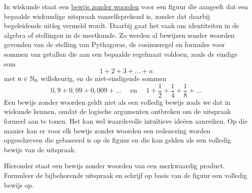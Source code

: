 \documentclass{ximera}
\begin{document}
\begin{Uitbreiding}
\begin{exercise}
In wiskunde staat een \underline{bewijs zonder woorden} voor een figuur die aangeeft dat een bepaalde wiskundige uitspraak vanzelfsprekend is, zonder dat daarbij begeleidende uitleg vermeld wordt. Daarbij gaat het vaak om identiteiten in de algebra of stellingen in de meetkunde. Zo werden al bewijzen zonder woorden gevonden van de stelling van Pythagoras, de cosinusregel en formules voor sommen van getallen die aan een bepaalde regelmaat voldoen, zoals de eindige som 
\[
1 + 2 + 3 + \dots + n 
\]
met $n \in \N_0$ willekeurig, en de niet-eindigende sommen 
\[
0,9 + 0,09 + 0,009 + \dots \quad \text{ en } \quad 1 + \frac{1}{2} + \frac{1}{4} + \frac{1}{8} + \dots
\]
Een bewijs zonder woorden geldt niet als een volledig bewijs zoals we dat in wiskunde kennen, omdat de logische argumenten ontbreken om de uitspraak formeel aan te tonen. Het kan wel waardevolle intuïtieve ideëen aanreiken. Op die manier kan er voor elk bewijs zonder woorden een redenering worden opgeschreven die gebaseerd is op de figuur en die kan gelden als een volledig bewijs van de uitspraak. 

Hieronder staat een bewijs zonder woorden van een merkwaardig product. Formuleer de bijbehorende uitspraak en schrijf op basis van de figuur een volledig bewijs op.







\begin{image}[\width]
	\begin{tikzpicture}[x=0.5cm, y=0.5cm]


\end{tikzpicture}
\end{image}
\end{exercise}
\end{Uitbreiding}
\end{document}
